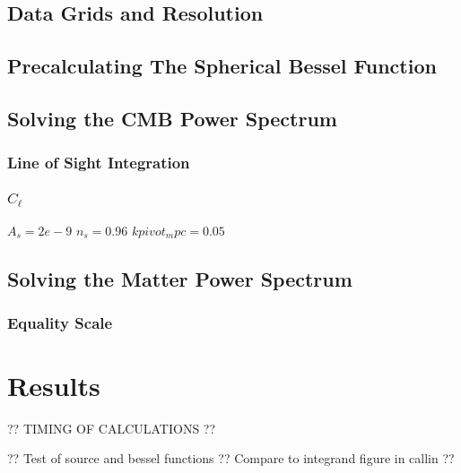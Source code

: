 \documentclass[10pt,a4paper]{article}
\begin{document}
\subsection{Data Grids and Resolution}
\label{subsec:Method/grid and resolution}

\subsection{Precalculating The Spherical Bessel Function}
\label{subsubsec:Method/Bessel function}

\subsection{Solving the CMB Power Spectrum}
\label{subsec:Method/Solve CMB}

\subsubsection{Line of Sight Integration}
\label{subsubsec:Method/LOS integration}

\subsubsection{$C_\ell$}
\label{subsubsec:Method/C_ell}
$A_s = 2e-9$
$n_s = 0.96$
$kpivot_mpc = 0.05$

\subsection{Solving the Matter Power Spectrum}
\label{subsec:Method/solving matter power spectrum}

\subsubsection{Equality Scale}
\label{subsubsec:Method/Equality Scale}

\section{Results}
\label{sec:Results}
?? TIMING OF CALCULATIONS ??

?? Test of source and bessel functions ?? Compare to integrand figure in callin ??
\end{document}
